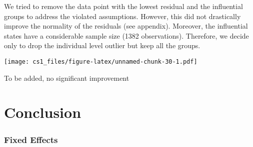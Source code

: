 \documentclass[
  11pt,
]{article}
\begin{document}
We tried to remove the data point with the lowest residual and the
influential groups to address the violated assumptions. However, this
did not drastically improve the normality of the residuals (see
appendix). Moreover, the influential states have a considerable sample
size (1382 observations). Therefore, we decide only to drop the
individual level outlier but keep all the groups.

\texttt{[image: cs1\_files/figure-latex/unnamed-chunk-30-1.pdf]}

To be added, no significant improvement

\hypertarget{conclusion}{%
\section{Conclusion}\label{conclusion}}

\hypertarget{fixed-effects}{%
\subsubsection{Fixed Effects}\label{fixed-effects}}
\end{document}
